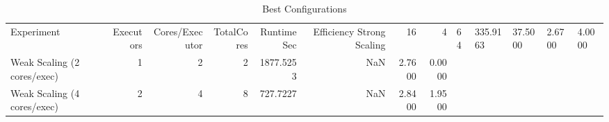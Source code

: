 \begin{table}
\caption{Best Configurations}
\label{tab:table6_best_configs}
\begin{tabular}{lrrrrrrr}
\toprule
Experiment & Executors & Cores/Executor & TotalCores & RuntimeSec & Efficiency%
\midrule
Strong Scaling & 16 & 4 & 64 & 335.9163 & 37.5000 & 2.6700 & 4.0000 \\
Weak Scaling (2 cores/exec) & 1 & 2 & 2 & 1877.5253 & NaN & 2.7600 & 0.0000 \\
Weak Scaling (4 cores/exec) & 2 & 4 & 8 & 727.7227 & NaN & 2.8400 & 1.9500 \\
\bottomrule
\end{tabular}
\end{table}
